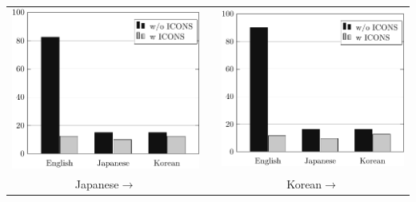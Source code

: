 \documentclass[a4paper]{article}
\begin{document}
\begin{tabular}[t]{ccc}
\includegraphics{avr-jpn.pdf} & \xspace & \includegraphics{avr-kor.pdf} \\
Japanese\ensuremath{\rightarrow} & & Korean\ensuremath{\rightarrow}\\
\end{tabular}
\end{document}
